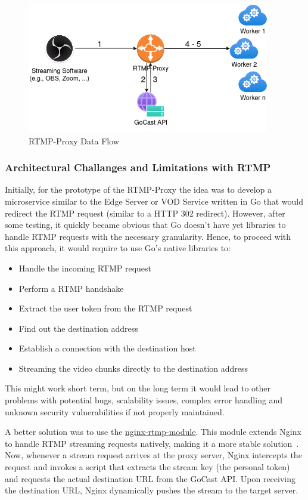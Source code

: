 \begin{figure}[htpb]
    \centering
    \includegraphics[width=300pt]{images/RtmpProxy.png}
    \caption[RTMP-Proxy Flow]{RTMP-Proxy Data Flow}\label{fig:rtmp-proxy}
\end{figure}

\subsubsection{Architectural Challanges and Limitations with RTMP}

Initially, for the prototype of the RTMP-Proxy the idea was to develop a microservice similar to the Edge Server or VOD Service written in Go that would redirect the \ac{RTMP} request (similar to a HTTP 302 redirect). However, after some testing, it quickly became obvious that Go doesn't have yet libraries to handle \ac{RTMP} requests with the necessary granularity. Hence, to proceed with this approach, it would require to use Go's native libraries to: 
\begin{itemize}
\item Handle the incoming \ac{RTMP} request
\item Perform a \ac{RTMP} handshake
\item Extract the user token from the \ac{RTMP} request
\item Find out the destination address
\item Establish a connection with the destination host
\item Streaming the video chunks directly to the destination address
\end{itemize}

This might work short term, but on the long term it would lead to other problems with potential bugs, scalability issues, complex error handling and unknown security vulnerabilities if not properly maintained.

A better solution was to use the \href{https://github.com/arut/nginx-rtmp-module}{nginx-rtmp-module}. This module extends Nginx to handle \ac{RTMP} streaming requests natively, making it a more stable solution~\parencite{nginx_rtmp_module}. 
Now, whenever a stream request arrives at the proxy server, Nginx intercepts the request and invokes a script that extracts the stream key (the personal token) and requests the actual destination URL from the GoCast \ac{API}. Upon receiving the destination URL, Nginx dynamically pushes the stream to the target server.

